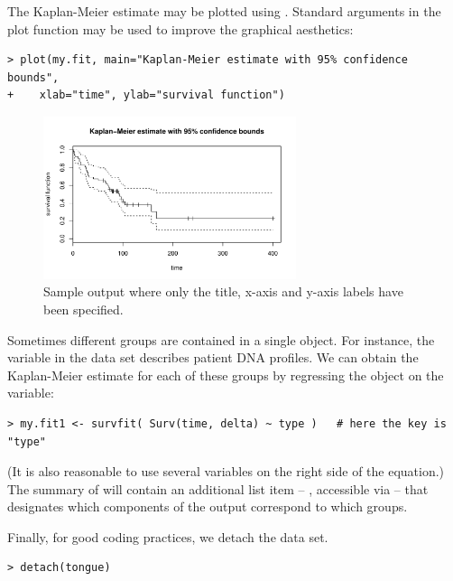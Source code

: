 \documentclass[11pt]{article}
\begin{document}
The Kaplan-Meier estimate may be plotted using . Standard arguments in the plot function may be used to improve the graphical aesthetics:
{\color{verbatimrcom}\begin{verbatim}
> plot(my.fit, main="Kaplan-Meier estimate with 95% confidence bounds",
+    xlab="time", ylab="survival function")
\end{verbatim}}
\begin{figure}[htp]
\centering
\includegraphics[width=0.66\textwidth]{../figures/kmPlot.pdf} \vspace{-4mm}
\caption{Sample output where only the title, x-axis and y-axis labels have been specified.}
\end{figure}
Sometimes different groups are contained in a single  object. For instance, the  variable in the  data set describes patient DNA profiles. We can obtain the Kaplan-Meier estimate for each of these groups by regressing the  object on the  variable:
{\color{verbatimrcom}\begin{verbatim}
> my.fit1 <- survfit( Surv(time, delta) ~ type )   # here the key is "type"
\end{verbatim}}
(It is also reasonable to use several variables on the right side of the equation.) The summary of  will contain an additional list item -- , accessible via  -- that designates which components of the output correspond to which groups.

Finally, for good coding practices, we detach the  data set.
{\color{verbatimrcom}\begin{verbatim}
> detach(tongue)
\end{verbatim}}


\pagebreak

{} \vspace{-1mm}\par
{}
\label{confBands}
\end{document}
